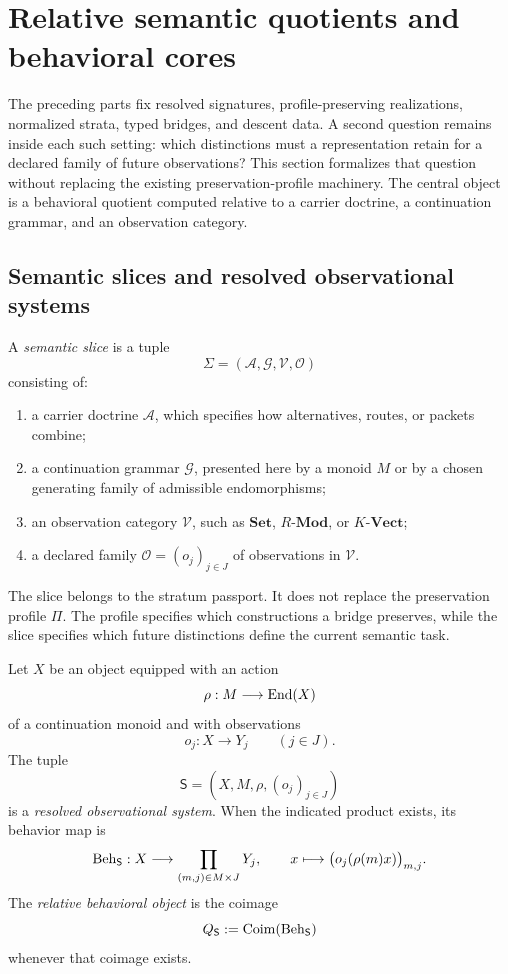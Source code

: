 \section{Relative semantic quotients and behavioral cores}
\label{sec:block17-semantic-quotients}

The preceding parts fix resolved signatures, profile-preserving realizations, normalized strata, typed bridges, and descent data.  A second question remains inside each such setting: which distinctions must a representation retain for a declared family of future observations?  This section formalizes that question without replacing the existing preservation-profile machinery.  The central object is a behavioral quotient computed relative to a carrier doctrine, a continuation grammar, and an observation category.

\subsection{Semantic slices and resolved observational systems}
\label{subsec:block17-semantic-slices}

\begin{definition}
\label{def:block17-semantic-slice}
A \emph{semantic slice} is a tuple
\[
 \Sigma=(\mathcal A,\mathcal G,\mathcal V,\mathcal O)
\]
consisting of:
\begin{enumerate}[label=\textup{(\roman*)}]
\item a carrier doctrine \(\mathcal A\), which specifies how alternatives, routes, or packets combine;
\item a continuation grammar \(\mathcal G\), presented here by a monoid \(M\) or by a chosen generating family of admissible endomorphisms;
\item an observation category \(\mathcal V\), such as \(\mathbf{Set}\), \(R\text{-}\mathbf{Mod}\), or \(K\text{-}\mathbf{Vect}\);
\item a declared family \(\mathcal O=(o_j)_{j\in J}\) of observations in \(\mathcal V\).
\end{enumerate}
The slice belongs to the stratum passport.  It does not replace the preservation profile \(\Pi\).  The profile specifies which constructions a bridge preserves, while the slice specifies which future distinctions define the current semantic task.
\end{definition}

\begin{definition}
\label{def:block17-observational-system}
Let \(X\) be an object equipped with an action
\[
 \rho:M\longrightarrow \operatorname{End}(X)
\]
of a continuation monoid and with observations
\[
 o_j:X\longrightarrow Y_j\qquad(j\in J).
\]
The tuple
\[
 \mathsf S=(X,M,\rho,(o_j)_{j\in J})
\]
is a \emph{resolved observational system}.  When the indicated product exists, its behavior map is
\[
 \operatorname{Beh}_{\mathsf S}:X\longrightarrow
 \prod_{(m,j)\in M\times J}Y_j,
 \qquad
 x\longmapsto\bigl(o_j(\rho(m)x)\bigr)_{m,j}.
\]
The \emph{relative behavioral object} is the coimage
\[
 Q_{\mathsf S}:=\operatorname{Coim}(\operatorname{Beh}_{\mathsf S})
\]
whenever that coimage exists.
\end{definition}

